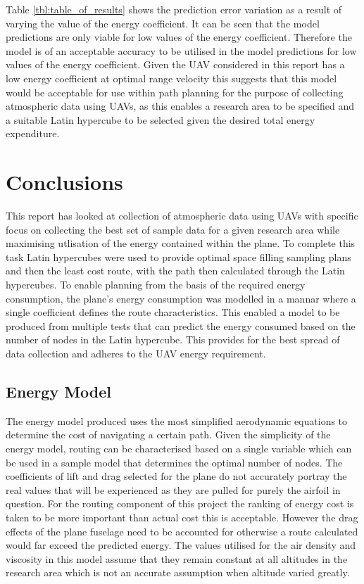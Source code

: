 \documentclass[a4paper,12pt,twoside]{article}
\begin{document}
Table \ref{tbl:table_of_results} shows the prediction error variation as a result of varying the value of the energy coefficient. It can be seen that the model predictions are only viable for low values of the energy coefficient. Therefore the model is of an acceptable accuracy to be utilised in the model predictions for low values of the energy coefficient. Given the UAV considered in this report has a low energy coefficient at optimal range velocity this suggests that this model would be acceptable for use within path planning for the purpose of collecting atmospheric data using UAVs, as this enables a research area to be specified and a suitable Latin hypercube to be selected given the desired total energy expenditure.

\section{Conclusions}
\label{sec:conclusions}

This report has looked at collection of atmospheric data using UAVs with specific focus on collecting the best set of sample data for a given research area while maximising utlisation of the energy contained within the plane. To complete this task Latin hypercubes were used to provide optimal space filling sampling plans and then the least cost route, with the path then calculated through the Latin hypercubes. To enable planning from the basis of the required energy consumption, the plane's energy consumption was modelled in a mannar where a single coefficient defines the route characteristics. This enabled a model to be produced from multiple tests that can predict the energy consumed based on the number of nodes in the Latin hypercube. This provides for the best spread of data collection and adheres to the UAV energy requirement.

\subsection{Energy Model}
\label{sec:energy_model_0}

The energy model produced uses the most simplified aerodynamic equations to determine the cost of navigating a certain path. Given the simplicity of the energy model, routing can be characterised based on a single variable which can be used in a sample model that determines the optimal number of nodes. The coefficients of lift and drag selected for the plane do not accurately portray the real values that will be experienced as they are pulled for purely the airfoil in question. For the routing component of this project the ranking of energy cost is taken to be more important than actual cost this is acceptable. However the drag effects of the plane fuselage need to be accounted for otherwise a route calculated would far exceed the predicted energy. The values utilised for the air density and viscosity in this model assume that they remain constant at all altitudes in the research area which is not an accurate assumption when altitude varied greatly.
\end{document}
